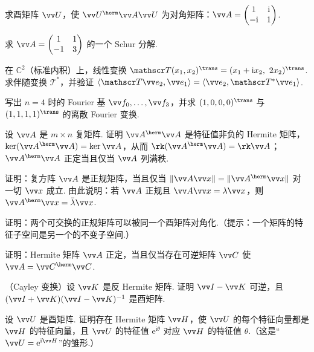 {\begin{exA}
			\item\label{ex:uni:A7} 求酉矩阵 $\vv U$，使 $\vv U^\herm\vv A\vv U$ 为对角矩阵：$\vv A=\begin{pmatrix}1&\mathrm i\\-\mathrm i&1\end{pmatrix}$.
			\item\label{ex:uni:A8} 求 $\vv A=\begin{pmatrix}1&1\\-1&3\end{pmatrix}$ 的一个 Schur 分解.
			\item\label{ex:uni:A9} 在 $\mathbb{C}^2$（标准内积）上，线性变换 $\mathscr T(x_1,x_2)^\trans=(x_1+\mathrm ix_2,\ 2x_2)^\trans$. 求伴随变换 $\mathscr T^*$，并验证 $\langle\mathscr T\vv e_2,\vv e_1\rangle=\langle\vv e_2,\mathscr T^*\vv e_1\rangle$.
			\item\label{ex:uni:A10} 写出 $n=4$ 时的 Fourier 基 $\vv f_0,\ldots,\vv f_3$，并求 $(1,0,0,0)^\trans$ 与 $(1,1,1,1)^\trans$ 的离散 Fourier 变换.
		\end{exA}
		
		\Bgroup
		\begin{exB}
			\item\label{ex:uni:B1} 设 $\vv A$ 是 $m\times n$ 复矩阵. 证明 $\vv A^\herm\vv A$ 是特征值非负的 Hermite 矩阵，$\ker(\vv A^\herm\vv A)=\ker\vv A$，从而 $\rk(\vv A^\herm\vv A)=\rk\vv A$；$\vv A^\herm\vv A$ 正定当且仅当 $\vv A$ 列满秩.
			\item\label{ex:uni:B2} 证明：复方阵 $\vv A$ 是正规矩阵，当且仅当 $\|\vv A\vv x\|=\|\vv A^\herm\vv x\|$ 对一切 $\vv x$ 成立. 由此说明：若 $\vv A$ 正规且 $\vv A\vv x=\lambda\vv x$，则 $\vv A^\herm\vv x=\bar\lambda\vv x$.
			\item\label{ex:uni:B3} 证明：两个可交换的正规矩阵可以被同一个酉矩阵对角化.（提示：一个矩阵的特征子空间是另一个的不变子空间.）
			\item\label{ex:uni:B4} 证明：Hermite 矩阵 $\vv A$ 正定，当且仅当存在可逆矩阵 $\vv C$ 使 $\vv A=\vv C^\herm\vv C$.
			\item\label{ex:uni:B5} （Cayley 变换）设 $\vv K$ 是反 Hermite 矩阵. 证明 $\vv I-\vv K$ 可逆，且 $(\vv I+\vv K)(\vv I-\vv K)^{-1}$ 是酉矩阵.
			\item\label{ex:uni:B6} 设 $\vv U$ 是酉矩阵. 证明存在 Hermite 矩阵 $\vv H$，使 $\vv U$ 的每个特征向量都是 $\vv H$ 的特征向量，且 $\vv U$ 的特征值 $\mathrm e^{\mathrm i\theta}$ 对应 $\vv H$ 的特征值 $\theta$.（这是“$\vv U=\mathrm e^{\mathrm i\vv H}$”的雏形.）
		\end{exB}
		
}
